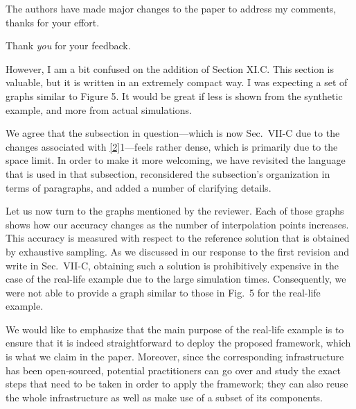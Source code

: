 \begin{reviewer}
The authors have made major changes to the paper to address my comments, thanks
for your effort.
\end{reviewer}

\begin{authors}
Thank \emph{you} for your feedback.
\end{authors}

\begin{reviewer}
However, I am a bit confused on the addition of Section XI.C. This section is
valuable, but it is written in an extremely compact way. I was expecting a set
of graphs similar to Figure 5. It would be great if less is shown from the
synthetic example, and more from actual simulations.
\end{reviewer}

\begin{authors}
We agree that the subsection in question---which is now Sec.~VII-C due to the
changes associated with \cref{2}{1}---feels rather dense, which is primarily due
to the space limit. In order to make it more welcoming, we have revisited the
language that is used in that subsection, reconsidered the subsection's
organization in terms of paragraphs, and added a number of clarifying details.

Let us now turn to the graphs mentioned by the reviewer. Each of those graphs
shows how our accuracy changes as the number of interpolation points increases.
This accuracy is measured with respect to the reference solution that is
obtained by exhaustive sampling. As we discussed in our response to the first
revision and write in Sec.~VII-C, obtaining such a solution is prohibitively
expensive in the case of the real-life example due to the large simulation
times. Consequently, we were not able to provide a graph similar to those in
Fig.~5 for the real-life example.

We would like to emphasize that the main purpose of the real-life example is to
ensure that it is indeed straightforward to deploy the proposed framework, which
is what we claim in the paper. Moreover, since the corresponding infrastructure
has been open-sourced, potential practitioners can go over and study the exact
steps that need to be taken in order to apply the framework; they can also reuse
the whole infrastructure as well as make use of a subset of its components.

\begin{actions}
\end{actions}
\end{authors}

